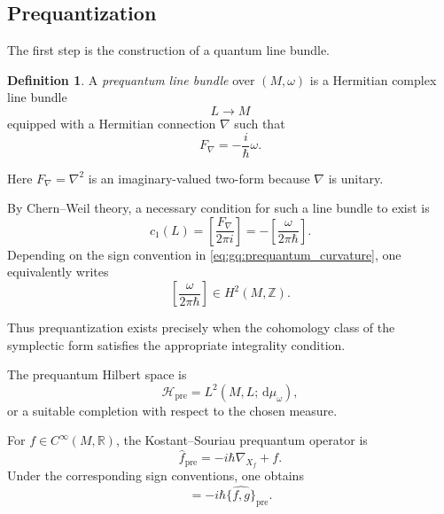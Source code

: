 \documentclass[a4paper,11pt]{article}
\theoremstyle{definition}
\newtheorem{definition}{Definition}[section]
\newcommand{\dd}{\,\mathrm{d}}
\newcommand{\cH}{\mathcal{H}}
\begin{document}
\subsection{Prequantization}
\label{app:gq:prequantization}

The first step is the construction of a quantum line bundle.

\begin{definition}
A \emph{prequantum line bundle} over $(M,\omega)$ is a Hermitian complex line
bundle
\begin{equation}
    L\longrightarrow M
\end{equation}
equipped with a Hermitian connection $\nabla$ such that
\begin{equation}
    F_\nabla
    =
    -\frac{i}{\hbar}\omega.
    \label{eq:gq:prequantum_curvature}
\end{equation}
\end{definition}

Here $F_\nabla=\nabla^2$ is an imaginary-valued two-form because $\nabla$ is
unitary.

By Chern--Weil theory, a necessary condition for such a line bundle to exist is
\begin{equation}
    c_1(L)
    =
    \left[
       \frac{F_\nabla}{2\pi i}
    \right]
    =
    -\left[
       \frac{\omega}{2\pi\hbar}
    \right].
\end{equation}
Depending on the sign convention in
\eqref{eq:gq:prequantum_curvature}, one equivalently writes
\begin{equation}
    \boxed{
    \left[
    \frac{\omega}{2\pi\hbar}
    \right]
    \in H^2(M,\mathbb Z).
    }
    \label{eq:gq:integrality}
\end{equation}

Thus prequantization exists precisely when the cohomology class of the
symplectic form satisfies the appropriate integrality condition.

The prequantum Hilbert space is
\begin{equation}
    \cH_{\mathrm{pre}}
    =
    L^2(M,L;\dd\mu_\omega),
\end{equation}
or a suitable completion with respect to the chosen measure.

For $f\in C^\infty(M,\mathbb R)$, the Kostant--Souriau prequantum operator is
\begin{equation}
    \widehat f_{\mathrm{pre}}
    =
    -i\hbar\nabla_{X_f}+f.
    \label{eq:gq:KS_operator}
\end{equation}
Under the corresponding sign conventions, one obtains
\begin{equation}
    [
       \widehat f_{\mathrm{pre}},
       \widehat g_{\mathrm{pre}}
    ]
    =
    -i\hbar
    \widehat{\{f,g\}}_{\mathrm{pre}}.
    \label{eq:gq:KS_commutator}
\end{equation}
\end{document}
